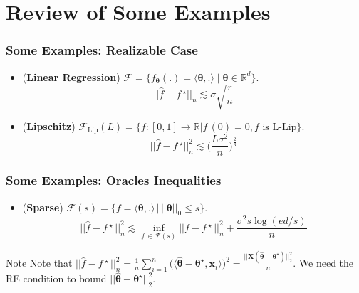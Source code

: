\documentclass[11pt]{beamer}
\newcommand{\bx}{\mathbf{x}}
\newcommand{\cF}{\mathcal{F}}
\newcommand{\fstar}{f\,^\star}
\newcommand{\fhat}{\widehat{f}}
\begin{document}
	\section{Review of Some Examples}
	\frame{\sectionpage}
	
	\begin{frame}
	\frametitle{Some Examples: Realizable Case}
	\begin{itemize}
		\item (\textbf{Linear Regression}) $\cF = \{f_{\boldsymbol{\theta}}(.) = \langle \boldsymbol{\theta}, . \rangle\;|\; \boldsymbol{\theta} \in \mathbb{R}^d\}$. 			
		\begin{equation*}
		||\fhat - \fstar||_n \lesssim \sigma\sqrt{\frac{r}{n}}
		\end{equation*}
		\pause
		\item (\textbf{Lipschitz}) $\cF_{\mathrm{Lip}}(L) = \{f:[0, 1] \to \mathbb{R} \big| f\,(0) = 0, f \text{ is L-Lip} \}$.
		\begin{equation*}
			||\fhat - \fstar||_n^2 \lesssim \Big(\frac{L\sigma^2}{n}\Big)^{\frac{2}{3}}
		\end{equation*}				
	\end{itemize}
	\end{frame}	
	\begin{frame}
		\frametitle{Some Examples: Oracles Inequalities}
		\begin{itemize}
		\item (\textbf{Sparse}) $\cF(s) = \{f = \langle \boldsymbol{\theta}, .\rangle \, \big|\, ||\boldsymbol{\theta}||_0\leq s\}$.
		\begin{equation*}
		||\widehat{f} - \fstar\,||_n^2 \lesssim \inf_{f\,\in \cF(s)} ||f - \fstar\,||_n^2 +  {\frac{\sigma^2s\log(ed/s)}{n}}
		\end{equation*}
		\end{itemize}
		\begin{block}{Note}
			Note that $||\widehat{f} - \fstar\,||_n^2 = \frac{1}{n}\sum_{i = 1}^{n}\big(\langle \hat{\boldsymbol{\theta}} - \boldsymbol{\theta}^\star, \bx_i\rangle\big)^2 = \frac{||\mathbf{X}(\hat{\boldsymbol{\theta}} - \boldsymbol{\theta}^\star)||_2^2}{n}$. We need the RE condition to bound $||\hat{\boldsymbol{\theta}} - \boldsymbol{\theta}^\star||_2^2$.
		\end{block}
	\end{frame}
\end{document}
